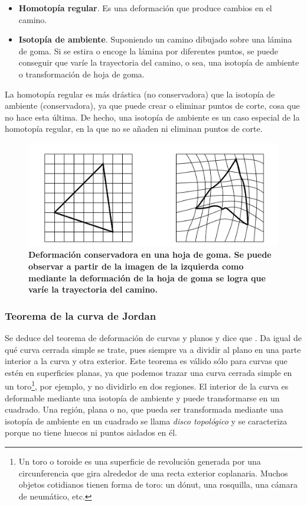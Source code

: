 \begin{itemize}
\item \textbf{Homotopía regular}. Es una deformación que produce cambios en el camino.
\item \textbf{Isotopía de ambiente}. Suponiendo un camino dibujado sobre una lámina de goma. Si se estira o encoge la lámina por diferentes puntos, se puede conseguir que varíe la trayectoria del camino, o sea, una isotopía de ambiente o transformación de hoja de goma.
\end{itemize}

La homotopía regular es más drástica (no conservadora) que la isotopía de ambiente (conservadora), ya que puede crear o eliminar puntos de corte, cosa que no hace esta última. De hecho, una isotopía de ambiente es un caso especial de la homotopía regular, en la que no se añaden ni eliminan puntos de corte.


\begin{figure}[h]
\includegraphics[width=14cm]{Img/GEO/geo-goma.jpg}
\centering
\caption{\textbf{\footnotesize{Deformación conservadora en una hoja de goma. Se puede  observar a partir de la imagen de la izquierda como mediante la deformación de la hoja de goma se logra que varíe la trayectoria del camino.}}}
\end{figure}


\subsubsection{Teorema de la curva de Jordan }
Se deduce del teorema de deformación de curvas y planos y dice que  \citep{Ramos2011}. Da igual de qué curva cerrada simple se trate, pues siempre va a dividir al plano en una parte interior a la curva y otra exterior. Este teorema es válido sólo para curvas que estén en superficies planas, ya que podemos trazar una curva cerrada simple en un toro\footnote{Un toro o toroide es una superficie de revolución generada por una circunferencia que gira alrededor de una recta exterior coplanaria. Muchos objetos cotidianos tienen forma de toro: un dónut, una rosquilla, una cámara de neumático, etc.}, por ejemplo, y no dividirlo en dos regiones.
El interior de la curva es deformable mediante una isotopía de ambiente y puede
transformarse en un cuadrado. Una región, plana o no, que pueda ser transformada mediante una isotopía de ambiente en un cuadrado se llama \textit{disco topológico} y se caracteriza porque no tiene huecos ni puntos aislados en él.

